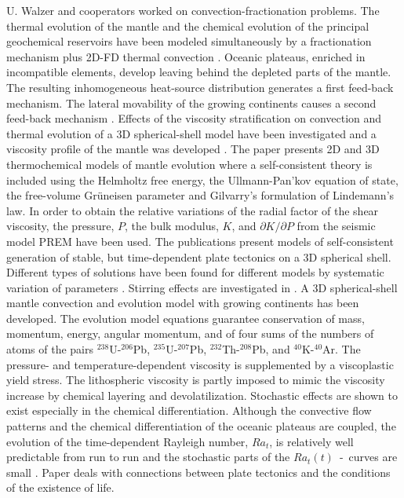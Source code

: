 \documentclass[twoside,10pt]{article}
\begin{document}
U. Walzer and cooperators worked on convection-fractionation problems. 
The thermal evolution of the mantle and the chemical evolution of the principal geochemical reservoirs have been modeled simultaneously by a fractionation mechanism plus 2D-FD thermal convection \cite{Walzer1997,Walzer1997a,Walzer1999,Walzer2000}.
Oceanic plateaus, enriched in incompatible elements, develop leaving behind
the depleted parts of the mantle. The resulting inhomogeneous heat-source
distribution generates a first feed-back mechanism. The lateral movability 
of the growing continents causes a second feed-back mechanism \cite{Walzer1999}.
Effects of the viscosity stratification on convection and thermal evolution
of a 3D spherical-shell model have been investigated and a 
viscosity profile of the mantle was developed \cite{Walzer2004,Walzer2004a}. 
The paper \cite{Walzer2005}
presents 2D and 3D thermochemical models of mantle evolution where a 
self-consistent theory is included using the Helmholtz free energy, 
the Ullmann-Pan'kov equation of state, the free-volume Gr\"uneisen parameter
and Gilvarry's formulation of Lindemann's law. In order to obtain the relative
variations of the radial factor of the shear viscosity, the pressure, $P$, 
the bulk modulus, $K$, and $\partial K / \partial P$ from the seismic model
PREM have been used. The publications \cite{Walzer2008a,Walzer2004a,Walzer2004b,
Walzer2006}
present models of self-consistent generation of stable, but time-dependent plate
tectonics on a 3D spherical shell. 
Different types of solutions have been found for different models by systematic variation of parameters 
\cite{Walzer2003,Walzer2004a,Walzer2007,Walzer2008c,Walzer2008a}. 
Stirring effects are investigated in \cite{Gottschaldt2006}. A 3D spherical-shell 
mantle convection and evolution model with growing continents 
\cite{Walzer2007,Walzer2008,Walzer2008a} has been developed. The evolution model
equations guarantee conservation of mass, momentum, energy, angular momentum, 
and of four sums of the numbers of atoms of the pairs $^{238}$U-$^{206}$Pb, 
$^{235}$U-$^{207}$Pb, $^{232}$Th-$^{208}$Pb, and $^{40}$K-$^{40}$Ar.
The pressure- and temperature-dependent viscosity is supplemented by a 
viscoplastic yield stress. The lithospheric viscosity is partly imposed to
mimic the viscosity increase by chemical layering and devolatilization.
Stochastic effects \cite{Walzer2008b} are shown to exist especially in the
chemical differentiation. Although the convective flow patterns and the
chemical differentiation of the oceanic plateaus are coupled, the evolution
of the time-dependent Rayleigh number, $Ra_t$, is relatively well predictable
from run to run and the stochastic parts of the $Ra_t(t)$~-~curves are small
\cite{Walzer2008a}. Paper \cite{Walzer2008} deals with connections between
plate tectonics and the conditions of the existence of life. 
\end{document}
